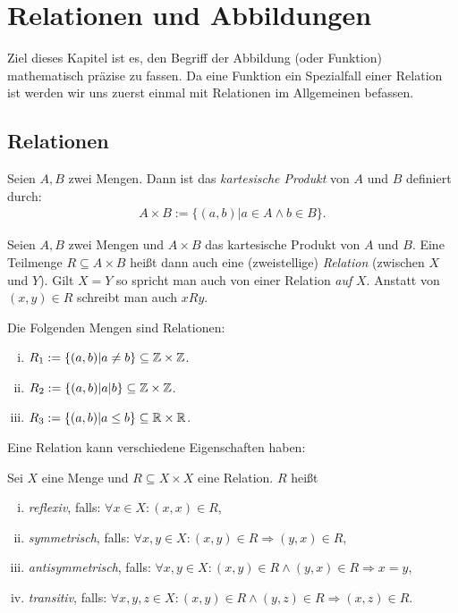 \chapter{Relationen und Abbildungen}

Ziel dieses Kapitel ist es, den Begriff der Abbildung (oder Funktion) mathematisch präzise zu fassen. 
Da eine Funktion ein Spezialfall einer Relation ist werden wir uns zuerst einmal mit Relationen im Allgemeinen befassen.

\section{Relationen}

\begin{mydef}
    Seien $A,B$ zwei Mengen. Dann ist das \textit{kartesische Produkt} von $A$ und $B$ definiert durch:
    \begin{align*}
        A \times B := \{ (a,b) | a \in A \wedge b \in B \}. 
    \end{align*}
\end{mydef}

\begin{mydef}
    Seien $A,B$ zwei Mengen und $A \times B$ das kartesische Produkt von $A$ und $B$. 
    Eine Teilmenge $R \subseteq A \times B$ heißt dann auch eine (zweistellige) \textit{Relation} (zwischen $X$ und $Y$).
    Gilt $X = Y$ so spricht man auch von einer Relation \textit{auf} $X$.  
    Anstatt von $(x,y) \in R$ schreibt man auch $xRy$. 
\end{mydef}

\begin{example}
    Die Folgenden Mengen sind Relationen: 
    \begin{enumerate}[(i)]
        \item 
         $R_1 := \{(a,b) | a \neq b \} \subseteq \mathbb{Z} \times \mathbb{Z}$.   
        \item 
        $R_2 := \{ (a,b) | a | b \} \subseteq \mathbb{Z} \times \mathbb{Z}$.
        \item 
        $R_3 := \{(a,b) | a \leq b\} \subseteq \mathbb{R} \times \mathbb{R}$. 
    \end{enumerate}
\end{example}

Eine Relation kann verschiedene Eigenschaften haben: 

\begin{mydef} 
    Sei $X$ eine Menge und $R \subseteq X \times X$ eine Relation. $R$ heißt
    \begin{enumerate}[(i)]
        \item 
        \textit{reflexiv}, falls: $\forall x \in X: (x,x) \in R$,
        \item 
        \textit{symmetrisch}, falls: $\forall x,y \in X : (x,y) \in R \Rightarrow (y,x) \in R$,
        \item 
        \textit{antisymmetrisch}, falls: $\forall x,y \in X: (x,y) \in R \wedge (y,x) \in R \Rightarrow x=y$,
        \item 
        \textit{transitiv}, falls: $\forall x,y,z \in X: (x,y) \in R \wedge (y,z) \in R \Rightarrow (x,z) \in R$. 
    \end{enumerate}
\end{mydef}

